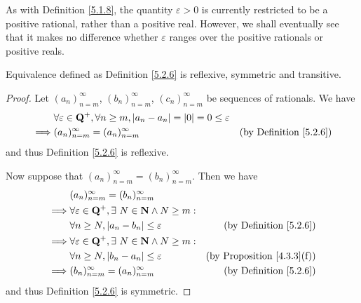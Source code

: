 \begin{remark}\label{5.2.7}
    As with Definition \ref{5.1.8}, the quantity \(\varepsilon > 0\) is currently restricted to be a positive rational, rather than a positive real.
    However, we shall eventually see that it makes no difference whether \(\varepsilon\) ranges over the positive rationals or positive reals.
\end{remark}

\begin{additional corollary}\label{ac 5.2.1}
Equivalence defined as Definition \ref{5.2.6} is reflexive, symmetric and transitive.
\end{additional corollary}

\begin{proof}
    Let \((a_n)_{n = m}^\infty\), \((b_n)_{n = m}^\infty\), \((c_n)_{n = m}^\infty\) be sequences of rationals.
    We have
    \begin{align*}
                 & \forall \varepsilon \in \mathbf{Q}^+, \forall n \geq m, \abs*{a_n - a_n} = \abs*{0} = 0 \leq \varepsilon                                      \\
        \implies & (a_n)_{n = m}^\infty = (a_n)_{n = m}^\infty                                                              & \text{(by Definition \ref{5.2.6})}
    \end{align*}
    and thus Definition \ref{5.2.6} is reflexive.

    Now suppose that \((a_n)_{n = m}^\infty = (b_n)_{n = m}^\infty\).
    Then we have
    \begin{align*}
                 & (a_n)_{n = m}^\infty = (b_n)_{n = m}^\infty                                                                              \\
        \implies & \forall \varepsilon \in \mathbf{Q}^+, \exists\ N \in \mathbf{N} \land N \geq m:                                          \\
                 & \forall n \geq N, \abs*{a_n - b_n} \leq \varepsilon                             & \text{(by Definition \ref{5.2.6})}     \\
        \implies & \forall \varepsilon \in \mathbf{Q}^+, \exists\ N \in \mathbf{N} \land N \geq m:                                          \\
                 & \forall n \geq N, \abs*{b_n - a_n} \leq \varepsilon                             & \text{(by Proposition \ref{4.3.3}(f))} \\
        \implies & (b_n)_{n = m}^\infty = (a_n)_{n = m}^\infty                                     & \text{(by Definition \ref{5.2.6})}
    \end{align*}
    and thus Definition \ref{5.2.6} is symmetric.


\end{proof}
